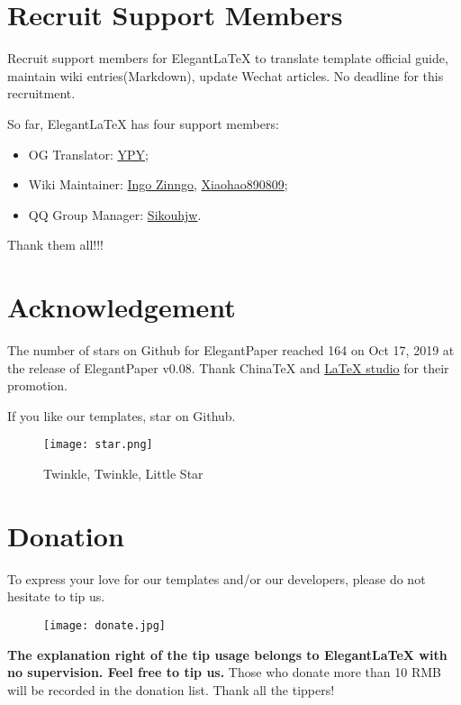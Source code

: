 \documentclass[11pt,en,authoryear]{elegantpaper}
\begin{document}
\section{Recruit Support Members}

Recruit support members for Elegant\LaTeX{} to translate template official guide, maintain wiki entries(Markdown), update Wechat articles. No deadline for this recruitment.

So far, Elegant\LaTeX{} has four support members:
\begin{itemize}
	\item OG Translator: \href{https://github.com/peggy2006xzyz}{YPY};
	\item Wiki Maintainer: \href{https://github.com/izinngo}{Ingo Zinngo}, \href{https://github.com/xiaohao890809}{Xiaohao890809};
	\item QQ Group Manager: \href{https://github.com/sikouhjw}{Sikouhjw}.
\end{itemize}

Thank them all!!!

\section{Acknowledgement}
The number of stars on Github for ElegantPaper reached 164 on Oct 17, 2019 at the release of ElegantPaper v0.08.
Thank China\TeX{} and \href{http://www.latexstudio.net/}{\LaTeX{} studio} for their promotion. 

If you like our templates, star on Github.
\begin{figure}[!ht]
	\centering
	\texttt{[image: star.png]}
	\caption{Twinkle, Twinkle, Little Star}
\end{figure}

\section{Donation}
To express your love for our templates and/or our developers, please do not hesitate to tip us.
\begin{figure}[!htbp]
	\centering
	\texttt{[image: donate.jpg]}
\end{figure}

\textbf{The explanation right of the tip usage belongs to Elegant\LaTeX{} with no supervision. Feel free to tip us.} Those who donate more than 10 RMB will be recorded in the donation list. Thank all the tippers!
\end{document}

